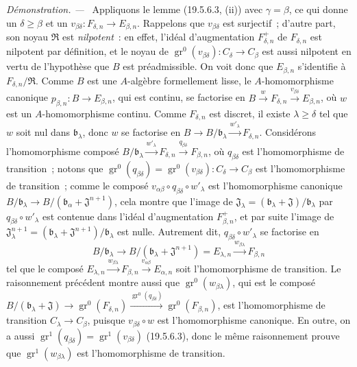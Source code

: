 \documentclass[10pt,oneside]{book}
\newcommand{\gr}{\operatorname{gr}}
\newenvironment{proof}{%
  \par\medskip\noindent\textit{Démonstration. ---\ }}{\par}
\begin{document}
\begin{proof}
Appliquons le lemme (19.5.6.3, (ii)) avec $\gamma=\beta$, ce qui donne un
$\delta\geq\beta$ et un
$v_{\beta\delta}:F_{\delta,n}\to E_{\beta,n}$. Rappelons que
$v_{\beta\delta}$ est surjectif~; d'autre part, son noyau $\mathfrak R$ est
\emph{nilpotent}~: en effet, l'idéal d'augmentation $F_{\delta,n}^+$ de
$F_{\delta,n}$ est nilpotent par définition, et le noyau de
$\gr^0(v_{\beta\delta}):C_\delta\to C_\beta$ est aussi nilpotent en vertu de
l'hypothèse que $B$ est préadmissible. On voit donc que $E_{\beta,n}$
s'identifie à $F_{\delta,n}/\mathfrak R$. Comme $B$ est une $A$-algèbre
formellement lisse, le $A$-homomorphisme canonique
$p_{\beta,n}:B\to E_{\beta,n}$, qui est continu, se factorise en
$B\xrightarrow{w}F_{\delta,n}\xrightarrow{v_{\beta\delta}}E_{\beta,n}$, où
$w$ est un $A$-homomorphisme continu. Comme $F_{\delta,n}$ est discret, il
existe $\lambda\geq\delta$ tel que $w$ soit nul dans $\mathfrak b_\lambda$,
donc $w$ se factorise en
$B\to B/\mathfrak b_\lambda\xrightarrow{w'_\lambda}F_{\delta,n}$. Considérons
l'homomorphisme composé
$B/\mathfrak b_\lambda\xrightarrow{w'_\lambda}F_{\delta,n}
\xrightarrow{q_{\beta\delta}}F_{\beta,n}$, où $q_{\beta\delta}$ est
l'homomorphisme de transition~; notons que
$\gr^0(q_{\beta\delta})=\gr^0(v_{\beta\delta}):C_\delta\to C_\beta$ est
l'homomorphisme de transition~; comme le composé
$v_{\alpha\beta}\circ q_{\beta\delta}\circ w'_\lambda$ est l'homomorphisme
canonique $B/\mathfrak b_\lambda\to
B/(\mathfrak b_\alpha+\mathfrak J^{n+1})$, cela montre que l'image de
$\mathfrak J_\lambda=(\mathfrak b_\lambda+\mathfrak J)/\mathfrak b_\lambda$
par $q_{\beta\delta}\circ w'_\lambda$ est contenue dans l'idéal d'augmentation
$F_{\beta,n}^+$, et par suite l'image de
$\mathfrak J_\lambda^{n+1}=(\mathfrak b_\lambda+\mathfrak J^{n+1})/
\mathfrak b_\lambda$ est nulle. Autrement dit,
$q_{\beta\delta}\circ w'_\lambda$ se factorise en
\[
  B/\mathfrak b_\lambda\to
  B/(\mathfrak b_\lambda+\mathfrak J^{n+1})=E_{\lambda,n}
  \xrightarrow{w_{\beta\lambda}}F_{\beta,n}
\]
tel que le composé
$E_{\lambda,n}\xrightarrow{w_{\beta\lambda}}F_{\beta,n}
\xrightarrow{v_{\alpha\beta}}E_{\alpha,n}$ soit l'homomorphisme de transition.
Le raisonnement précédent montre aussi que $\gr^0(w_{\beta\lambda})$, qui est
le composé
$B/(\mathfrak b_\lambda+\mathfrak J)\to\gr^0(F_{\delta,n})
\xrightarrow{\gr^0(q_{\beta\delta})}\gr^0(F_{\beta,n})$, est l'homomorphisme
de transition $C_\lambda\to C_\beta$, puisque
$v_{\beta\delta}\circ w$ est l'homomorphisme canonique. En outre, on a aussi
$\gr^1(q_{\beta\delta})=\gr^1(v_{\beta\delta})$ (19.5.6.3), donc le même
raisonnement prouve que $\gr^1(w_{\beta\lambda})$ est l'homomorphisme de
transition.
\end{proof}
\end{document}
